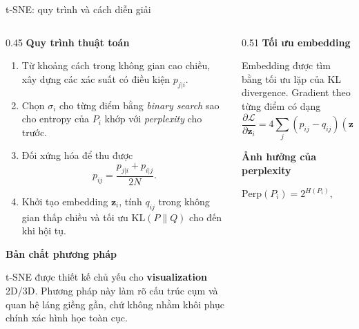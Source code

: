\begin{frame}[shrink=4]{t-SNE: quy trình và cách diễn giải}
    \scriptsize
    \setlength{\abovedisplayskip}{4pt}
    \setlength{\belowdisplayskip}{4pt}
    \begin{columns}[T,onlytextwidth]
        \begin{column}{0.45\textwidth}
            {\bfseries Quy trình thuật toán}

            \begin{enumerate}
                \item Từ khoảng cách trong không gian cao chiều, xây dựng các xác suất có điều kiện $p_{j|i}$.
                \item Chọn $\sigma_i$ cho từng điểm bằng \textit{binary search} sao cho entropy của $P_i$ khớp với \textit{perplexity} cho trước.
                \item Đối xứng hóa để thu được
                \[
                    p_{ij}=\frac{p_{j|i}+p_{i|j}}{2N}.
                \]
                \item Khởi tạo embedding $\mathbf{z}_i$, tính $q_{ij}$ trong không gian thấp chiều và tối ưu \(\mathrm{KL}(P\|Q)\) cho đến khi hội tụ.
            \end{enumerate}

            \vspace{0.06cm}
            {\bfseries Bản chất phương pháp}

            t-SNE được thiết kế chủ yếu cho \textbf{visualization} 2D/3D. Phương pháp này làm rõ cấu trúc cụm và quan hệ láng giềng gần, chứ không nhằm khôi phục chính xác hình học toàn cục.
        \end{column}

        \begin{column}{0.51\textwidth}
            {\bfseries Tối ưu embedding}

            Embedding được tìm bằng tối ưu lặp của KL divergence. Gradient theo từng điểm có dạng
            \[
                \frac{\partial \mathcal{L}}{\partial \mathbf{z}_i}
                =
                4\sum_j (p_{ij}-q_{ij})(\mathbf{z}_i-\mathbf{z}_j)(1+\|\mathbf{z}_i-\mathbf{z}_j\|^2)^{-1}.
            \]

            \vspace{0.1cm}
            {\bfseries Ảnh hưởng của perplexity}

            \[
                \mathrm{Perp}(P_i)=2^{H(P_i)},
                \qquad
                H(P_i)=-\sum_j p_{j|i}\log_2 p_{j|i}
            \]


\end{column}
\end{columns}
\end{frame}
